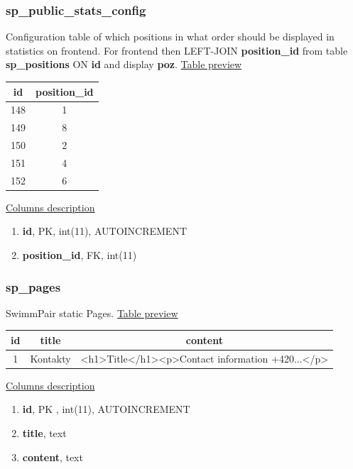 \subsubsection*{sp\_public\_stats\_config}
Configuration table of which positions in what order should be displayed in statistics on frontend. For frontend then LEFT-JOIN \textbf{position\_id} from table \textbf{sp\_positions} ON \textbf{id} and display \textbf{poz}.
\newline
\underline{Table preview}
\begin{center}
 \begin{tabular}{||c c||} 
 \hline
 id & position\_id  \\ [0.5ex] 
 \hline\hline
 148 & 1 \\ 
 \hline
 149 & 8  \\ 
 \hline
 150 & 2  \\ 
 \hline
 151 & 4  \\ 
 \hline
 152 & 6  \\  
 \hline
 \end{tabular}
\end{center}
\underline{Columns description}
\begin{enumerate}
  \setlength\itemsep{0em}
  \item \textbf{id}, PK, int(11), AUTOINCREMENT
  \item \textbf{position\_id}, FK, int(11)
\end{enumerate}

\subsubsection*{sp\_pages}
SwimmPair static Pages.
\newline
\underline{Table preview}
\begin{center}
 \begin{tabular}{||c c c||} 
 \hline
 id & title & content \\ [0.5ex] 
 \hline\hline
 1 & Kontakty &  \textless h1\textgreater Title\textless /h1\textgreater  \textless p\textgreater Contact information +420...\textless /p\textgreater  \\

 \hline
\end{tabular}
\end{center}
\underline{Columns description}
\begin{enumerate}
  \setlength\itemsep{0em}
  \item \textbf{id}, PK , int(11), AUTOINCREMENT
  \item \textbf{title}, text
  \item \textbf{content}, text
\end{enumerate}
\newpage
